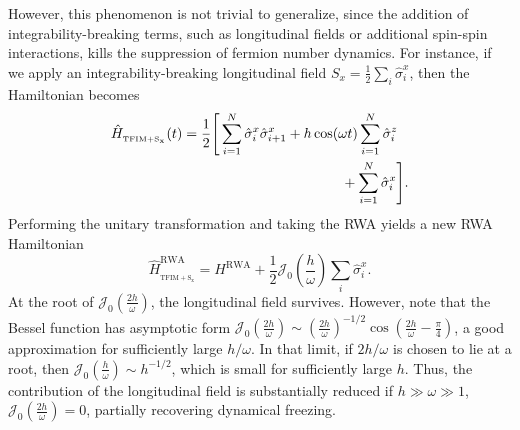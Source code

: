 \documentclass[%
reprint,
superscriptaddress,
amsmath,amssymb,
aps,
prb,
showkeys,
]{revtex4-2}
\begin{document}
However, this phenomenon is not trivial to generalize, since the addition of integrability-breaking terms, such as longitudinal fields or additional spin-spin interactions, kills the suppression of fermion number dynamics.  For instance, if we apply an integrability-breaking longitudinal field $S_x = \frac12 \sum_i \hat{\sigma}^x_i$, then the Hamiltonian becomes 
\begin{align}
	\hat{H}_{_\mathrm{TFIM+S_{x}}}(t) &=\frac12 \Bigg[\sum^N_{i=1}  \hat{\sigma}_{i}^{x} \hat{\sigma}_{i+1}^{x}+h \cos (\omega t) \sum^N_{i=1} \hat{\sigma}_{i}^{z}\nonumber\\
	&\hskip4cm  +\sum^N_{i=1} \hat{\sigma}_{i}^{x}\Bigg].
	\label{eq:tfim_sx}
\end{align}	
Performing the unitary transformation and taking the RWA yields a new RWA Hamiltonian
\begin{equation}
	\hat{H}_{_\mathrm{TFIM+S_{x}}}^{\mathrm{RWA}}= H^{\mathrm{RWA}}+\frac12 \mathcal{J}_{0}\left(\frac{h}{\omega}\right) \sum_i\hat{\sigma}^x_i.
	\label{eq:tfim_sx1}
\end{equation}
At the root of $\mathcal{J}_0\left(\frac{2h}{\omega}\right)$, the longitudinal field survives. However, note that the Bessel function has asymptotic form $\mathcal{J}_0\left(\frac{2h}{\omega}\right)\sim \left(\frac{2h}{\omega}\right)^{-1/2}\cos\left(\frac{2h}{\omega}-\frac{\pi}{4}\right)$, a good approximation for sufficiently  large $h/\omega$. In that limit, if $2h/\omega$ is chosen to lie at a root, then $\mathcal{J}_0\left(\frac{h}{\omega}\right) \sim h^{-1/2}$, which is small for sufficiently large $h$. Thus, the contribution of the longitudinal field is substantially reduced if $h\gg\omega\gg1$, $\mathcal{J}_0\left(\frac{2h}{\omega}\right)=0$, partially recovering dynamical freezing.
\end{document}
